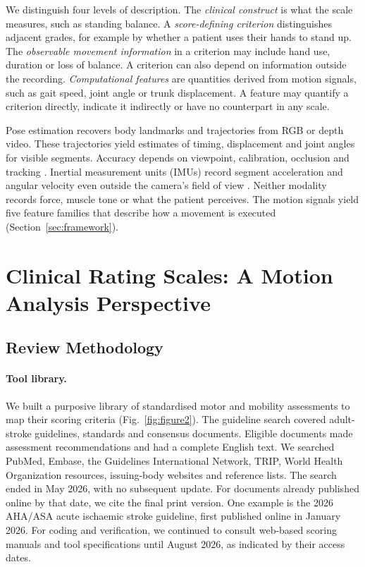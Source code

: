\documentclass[11pt]{article}
\begin{document}
We distinguish four levels of description. The \emph{clinical construct} is what the scale measures, such as standing balance. A \emph{score-defining criterion} distinguishes adjacent grades, for example by whether a patient uses their hands to stand up. The \emph{observable movement information} in a criterion may include hand use, duration or loss of balance. A criterion can also depend on information outside the recording. \emph{Computational features} are quantities derived from motion signals, such as gait speed, joint angle or trunk displacement. A feature may quantify a criterion directly, indicate it indirectly or have no counterpart in any scale.

Pose estimation recovers body landmarks and trajectories from RGB or depth video. These trajectories yield estimates of timing, displacement and joint angles for visible segments. Accuracy depends on viewpoint, calibration, occlusion and tracking \cite{S3Luvizutto202234115576,S3Lonini202235224426,S3John202437682075}. Inertial measurement units (IMUs) record segment acceleration and angular velocity even outside the camera's field of view \cite{S3OBrien202236304845,Yang2013SpatiotemporalGait}. Neither modality records force, muscle tone or what the patient perceives. The motion signals yield five feature families that describe how a movement is executed (Section~\ref{sec:framework}).

\section{Clinical Rating Scales: A Motion Analysis Perspective}
\label{sec:scales}

\subsection{Review Methodology}

\paragraph{Tool library.} We built a purposive library of standardised motor and mobility assessments to map their scoring criteria (Fig.~\ref{fig:figure2}). The guideline search covered adult-stroke guidelines, standards and consensus documents. Eligible documents made assessment recommendations and had a complete English text. We searched PubMed, Embase, the Guidelines International Network, TRIP, World Health Organization resources, issuing-body websites and reference lists. The search ended in May 2026, with no subsequent update. For documents already published online by that date, we cite the final print version. One example is the 2026 AHA/ASA acute ischaemic stroke guideline, first published online in January 2026. For coding and verification, we continued to consult web-based scoring manuals and tool specifications until August 2026, as indicated by their access dates.
\end{document}
